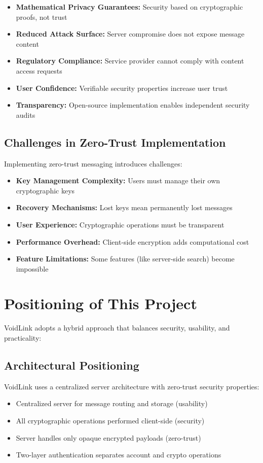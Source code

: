 \begin{itemize}
    \item \textbf{Mathematical Privacy Guarantees:} Security based on cryptographic proofs, not trust
    \item \textbf{Reduced Attack Surface:} Server compromise does not expose message content
    \item \textbf{Regulatory Compliance:} Service provider cannot comply with content access requests
    \item \textbf{User Confidence:} Verifiable security properties increase user trust
    \item \textbf{Transparency:} Open-source implementation enables independent security audits
\end{itemize}

\subsection{Challenges in Zero-Trust Implementation}

Implementing zero-trust messaging introduces challenges:

\begin{itemize}
    \item \textbf{Key Management Complexity:} Users must manage their own cryptographic keys
    \item \textbf{Recovery Mechanisms:} Lost keys mean permanently lost messages
    \item \textbf{User Experience:} Cryptographic operations must be transparent
    \item \textbf{Performance Overhead:} Client-side encryption adds computational cost
    \item \textbf{Feature Limitations:} Some features (like server-side search) become impossible
\end{itemize}

\section{Positioning of This Project}

VoidLink adopts a hybrid approach that balances security, usability, and practicality:

\subsection{Architectural Positioning}

VoidLink uses a centralized server architecture with zero-trust security properties:
\begin{itemize}
    \item Centralized server for message routing and storage (usability)
    \item All cryptographic operations performed client-side (security)
    \item Server handles only opaque encrypted payloads (zero-trust)
    \item Two-layer authentication separates account and crypto operations
\end{itemize}

